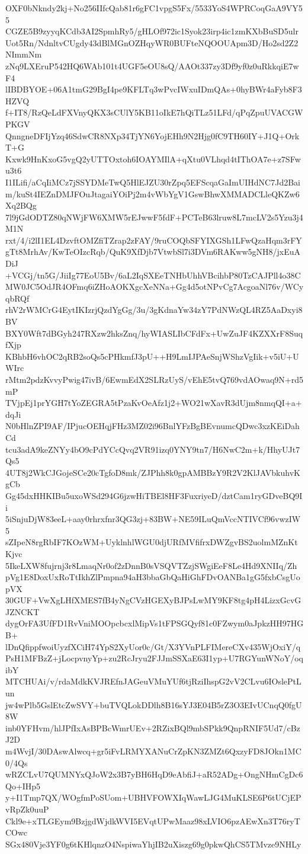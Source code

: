 OXF0bNkndy2kj+No256IIfcQab81r6gFC1vpgS5Fx/5533YoS4WPRCoqGaA9VY55
CGZE5B9zyyqKCdb3AI2SpmhRy5/gHLOf972ic1Syok23irp4ic1zmKXbBuSD5ulr
Uot5Rn/NdnltvCUgdy43dBlMGnOZHqyWR0BUFteNQOOUApm3D/Ho2sd2Z2NImmNm
zNq9LXEruP542HQ6WAb101t4UGF5eOU8sQ/AAOt337zy3Df9yf0z0uRkkqiE7wF4
lIBDBYOE+06A1tmG29BgI4pe9KFLTq3wPvcIWxuIDmQAs+0hyBWr4aFyb8F3HZVQ
f+IT8/RzQeLdFXVnyQKX3sCUlY5KB11oIkE7hQiTLz51LFd/qPqZpuUVACGWPKGV
QnngneDFIjYzq46SdwCR8NXp34TjYN6YojEHh9N2Hjg0fC9TH60IY+J1Q+OrkT+G
Kxwk9HnKxoG5vgQ2yUTTOxtoh6IOAYMIlA+qXtu0VLhqd4tIThOA7e+z7SFwu3t6
I1ILifi/aCqIiMCz7jSSYDMeTwQ5HlEJZU30rZpq5EFScqaGaImUIHdNC7Jd2Bai
m/kuSt4IEZnDMJFOuJtagaiYOiPj2m4vWbYgV1GswBhwXMMADCLleQKZw6Xq2BQg
7l9jGdODTZ80qNWjFW6XMW5rEJwwF5fdF+PCTeB63lruw8L7mcLV2s5Yzu3j4M1N
rxt/4/i2lI1EL4DzvftOMZfiTZrap2zFAY/9ruCOQbSFYIXGSh1LFwQzaHqm3rFY
gTt8MrhAv/KwTeOIzcRqb/QuK9XfDjb7VtwbSl7i3DVm6RAKww5gNH8/jxEuADiJ
+VCGj/tn5G/JiiIg77EoU5Bv/6aL2IqSXEeTNHbUhhVBcihbP80TzCAJPll4o38C
MW0JC5OdJR4OFmq6iZHoAOKXgcXeNNa+Gg4d5otNPvCg7AcgoaNl76v/WCyqbRQf
rhV2rWMCrG4EytIKIzrjQzdYgGg/3u/3gKdnaYw34zY7PdNWzQL4RZ5AaDxyi8BV
BXY0Wft7dBGyh247RXzw2hksZnq/hyWIASLIbCFdFx+UwZuJF4KZXXrF8SuqfXjp
KBhbH6vhOC2qRB2soQs5cPHkmfJ3pU++H9LmIJPAeSnjWShzVgIik+v5iU+UWIrc
rMtm2pdzKvvyPwig47ivB/6EwmEdX2SLRzUyS/vEhE5tvQ769vdAOwaq9N+rd5mP
TVjpEj1prYGH7tYoZEGRA5tPzaKvOeAfz1j2+WO21wXavR3dUjm8nmqQI+a+dqJi
N0bHlnZPI9AF/IPjucOEHqjFHz3MZ02i96BnlYFzBgBEvnumcQDwc3xzKEiDahCd
tcu3adA9keZNYy4bO9cPdYCcQvq2VR91izq0YNY9tn7/H6NwC2m+k/HhyUJt7Qs5
4UT8j2WkCJGojeSCe20cTgfoD8mk/ZJPhh8k0gpAMBBzY9R2V2KlJAVbkuhvKgCb
Gg45dxHHKIBu5uxoWSd294G6jzwHiTBEl8HF3FuxriyeD/dztCam1ryGDveBQ9Ii
5iSnjuDjW83eeL+aay0rhrxfnr3QG3zj+83BW+NE59ILuQmVccNTIVCf96vwzIW5
sZIpeN8rgRbIF7KOzWM+UyklnhlWGU0djURfMVfifrxDWZgvBS2uolmMZnKtKjvc
5IkeLXW8fujrnj3r8LmaqNr0of2zDnnB0sVSQVTZzjSWgiEeF8Le4Hd9XNIIq/Zh
pVg1E8DoxUxRoTtIkhZlPmpna94aH3bbaGbQaHiGhFDvOANBa1gG5fxbCsgUopVX
30GUF+VwXgLHfXMES7fB4yNgCVzHGEXyBJPsLwMY9KF8tg4pH4LizxGcvGJZNCKT
dygOrFA3UfFD1RvVniMOOpcbcxlMipVs1tFPSGQyf81c0FZwym0aJpkzHH97HGB+
lDnQfippfwoiUyzfXCiH74YpS2XyUor0c/Gt/X3YVnPLFIMereCXv435WjOxiY/q
PsH1MFBzZ+jLocpvnyYp+zu2RcJryu2FJJmSSXaE63I1yp+U7RGYunWNoY/oqibY
MTCHUAi/v/rdaMdkKVJREfnJAGeuVMuYUf6tjRziIhspG2vV2CLvu6IOslePtLun
jw4wPlb5GslEtcZwSVY+buTVQLokDDlh8B16sYJ3E04B5rZ3O3EIvUCnqQ0fgU8W
inb0YFHvm/hlJPfIxAsBPBcWmrUEv+2RZixBQl9mbSPkk9QnpRNIF5Ud7/cBzJ2D
m4WvjI/30DAswAlwcq+gr5iFvLRMYXANuCrZpKN3ZMZt6QxzyFD8JOkn1MC0/4Qs
wRZCLvU7QUMNYxQJoW2x3B7yBH6HqD9eAbfiJ+aR52ADg+OngNHmCgDc6Qo+IHp5
y+I1Tmp7QX/WOgfmPoSUom+UBHVFOWXIqWawLJG4MuKLSE6P6tUCjEPvRpZk0uuP
Ckl9e+xTLGEym9BzjgdWjdkWVI5EVqtUPwMaaz98xLVIO6pzAEwXn3T76ryTCOwc
SGx480Vje3YF0g6tKHlqnzO4NspiwaYhjIB2uXiszg69g0pkwQhCS5TMvze9NHLy
